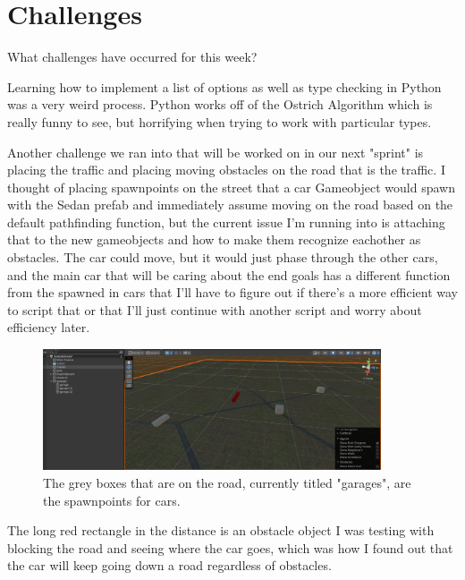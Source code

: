 \section{Challenges}

What challenges have occurred for this week?

Learning how to implement a list of options as well as type checking in Python was a very weird process. 
Python works off of the Ostrich Algorithm which is really funny to see, but horrifying when trying to work with particular types.

\begin{flushleft}
Another challenge we ran into that will be worked on in our next "sprint" is placing the traffic and placing moving obstacles on the road that is the traffic. I thought of placing spawnpoints on the street that a car Gameobject would spawn with the Sedan prefab and immediately assume moving on the road based on the default pathfinding function, but the current issue I'm running into is attaching that to the new gameobjects and how to make them recognize eachother as obstacles. The car could move, but it would just phase through the other cars, and the main car that will be caring about the end goals has a different function from the spawned in cars that I'll have to figure out if there's a more efficient way to script that or that I'll just continue with another script and worry about efficiency later.
\end{flushleft}

\begin{figure}[!ht]
    \centering
    \includegraphics[width=10cm]{../Images/Update4/Garages.png}
       \caption{The grey boxes that are on the road, currently titled "garages", are the spawnpoints for cars.}
           \label{Fig: Bake Mesh Settings}
\end{figure}

\begin{flushleft}
The long red rectangle in the distance is an obstacle object I was testing with blocking the road and seeing where the car goes, which was how I found out that the car will keep going down a road regardless of obstacles.
\end{flushleft}
